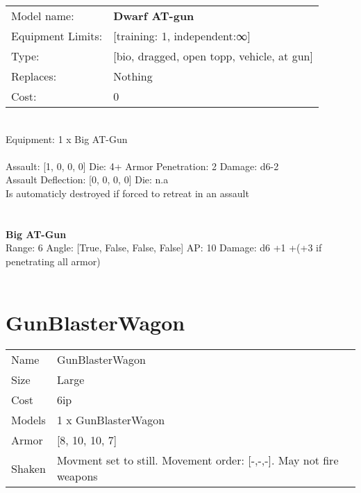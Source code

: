 \noindent
\begin{tabular}{ll}
Model name: &{\bf Dwarf AT-gun } \\
Equipment Limits: &[training: 1, independent:∞] \\
Type: &[bio, dragged, open topp, vehicle, at gun] \\
Replaces: &Nothing \\
Cost: & 0\\
\end{tabular}
\ \\
Equipment: 1 x Big AT-Gun \\
\ \\
Assault: [1, 0, 0, 0] Die: 4+ Armor Penetration: 2 Damage: d6-2 \\
Assault Deflection: [0, 0, 0, 0] Die: n.a\\
\indent Is automaticly destroyed if forced to retreat in an assault\\ 
 
\ \\

\ \\
{\bf Big AT-Gun } \\



Range: 6  Angle: [True, False, False, False] AP: 10 Damage: d6 +1 +(+3 if penetrating all armor) \\




 
\ \\













\clearpage

\section{ GunBlasterWagon }

\begin{tabular}{ll}
  Name & GunBlasterWagon \\
  Size & Large\\
  Cost & 6ip\\
  Models & 1 x GunBlasterWagon\\
  Armor & [8, 10, 10, 7]\\
  Shaken & Movment set to still. Movement order: [-,-,-]. May not fire weapons\\
\end{tabular}

